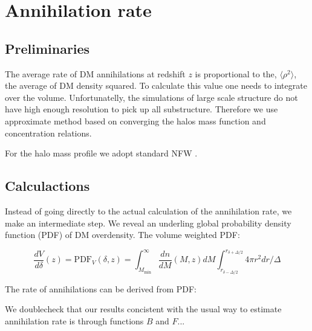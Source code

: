 \section{Annihilation rate}

\subsection{Preliminaries}

The average rate of DM annihilations at redshift $z$ is proportional to the, $\langle \rho^2 \rangle$, the average of DM density squared. To calculate this value one needs to integrate over the volume. Unfortunatelly, the simulations of large scale structure do not have high enough resolution to pick up all substructure. Therefore we use approximate method based on converging the halos mass function and concentration relations.


For the halo mass profile we adopt standard NFW \cite{1997ApJ...490..493N}. 



\subsection{Calculactions}

Instead of going directly to the actual calculation of the annihilation rate, we make an intermediate step. We reveal an underling global probability density function (PDF) of DM overdensity. The volume weighted PDF:

\begin{equation}
\dfrac{dV}{d\delta}(z)=\mathrm{PDF}_V (\delta, z) = \int_{M_\mathrm{min}}^\infty \dfrac{dn}{dM}(M,z) dM \int_{r_{\delta-\Delta/2}}^{r_{\delta+\Delta/2}} 4\pi r^2 dr / \Delta
\end{equation}

The rate of annihilations can be derived from PDF:



We doublecheck that our results concistent with the usual way to estimate annihilation rate is through functions $B$ and $F$...

